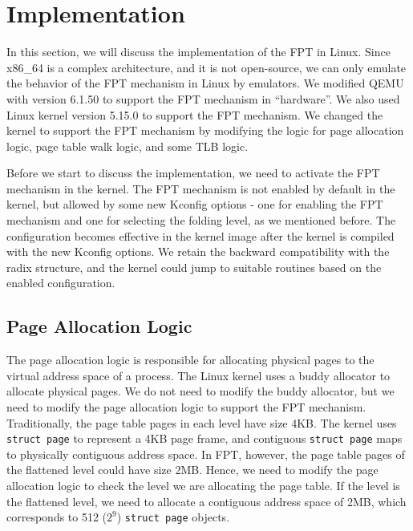 \section{Implementation}


In this section, we will discuss the implementation of the FPT in Linux. Since x86\_64 is a complex architecture, and it is not open-source, we can only emulate the behavior of the FPT mechanism in Linux by emulators. We modified QEMU with version 6.1.50 to support the FPT mechanism in ``hardware''. We also used Linux kernel version 5.15.0 to support the FPT mechanism. We changed the kernel to support the FPT mechanism by modifying the logic for page allocation logic, page table walk logic, and some TLB logic.

Before we start to discuss the implementation, we need to activate the FPT mechanism in the kernel. The FPT mechanism is not enabled by default in the kernel, but allowed by some new Kconfig options - one for enabling the FPT mechanism and one for selecting the folding level, as we mentioned before. The configuration becomes effective in the kernel image after the kernel is compiled with the new Kconfig options. We retain the backward compatibility with the radix structure, and the kernel could jump to suitable routines based on the enabled configuration.

\subsection{Page Allocation Logic}

The page allocation logic is responsible for allocating physical pages to the virtual address space of a process. The Linux kernel uses a buddy allocator to allocate physical pages. We do not need to modify the buddy allocator, but we need to modify the page allocation logic to support the FPT mechanism. Traditionally, the page table pages in each level have size 4KB. The kernel uses \texttt{struct page} to represent a 4KB page frame, and contiguous \texttt{struct page} maps to physically contiguous address space. In FPT, however, the page table pages of the flattened level could have size 2MB. Hence, we need to modify the page allocation logic to check the level we are allocating the page table. If the level is the flattened level, we need to allocate a contiguous address space of 2MB, which corresponds to 512 ($2^9$) \texttt{struct page} objects.

